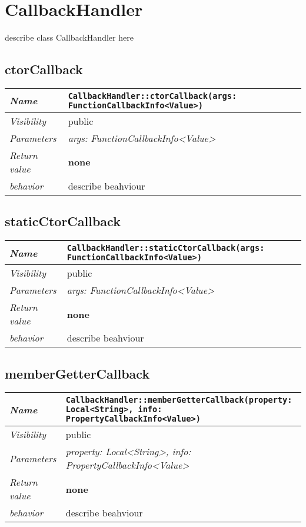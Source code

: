 \chapter{CallbackHandler}
describe class CallbackHandler here
\section{ctorCallback}
\begin{longtable}{p{3cm} @{\hskip 1cm} p{12cm}}
 \hline
\textit{Name} & \texttt{CallbackHandler::ctorCallback(args: FunctionCallbackInfo<Value>)}\\
\hline
 \textit{Visibility} & public\\
\hline
\textit{Parameters} & \textit{args: FunctionCallbackInfo<Value>}\\
\hline
\textit{Return value} & \textbf{none}\\
  \hline
 \textit{behavior} & describe beahviour \\
\hline
\end{longtable} \pagebreak
 \section{staticCtorCallback}
\begin{longtable}{p{3cm} @{\hskip 1cm} p{12cm}}
 \hline
\textit{Name} & \texttt{CallbackHandler::staticCtorCallback(args: FunctionCallbackInfo<Value>)}\\
\hline
 \textit{Visibility} & public\\
\hline
\textit{Parameters} & \textit{args: FunctionCallbackInfo<Value>}\\
\hline
\textit{Return value} & \textbf{none}\\
  \hline
 \textit{behavior} & describe beahviour \\
\hline
\end{longtable} \pagebreak
 \section{memberGetterCallback}
\begin{longtable}{p{3cm} @{\hskip 1cm} p{12cm}}
 \hline
\textit{Name} & \texttt{CallbackHandler::memberGetterCallback(property: Local<String>, info: PropertyCallbackInfo<Value>)}\\
\hline
 \textit{Visibility} & public\\
\hline
\textit{Parameters} & \textit{property: Local<String>, info: PropertyCallbackInfo<Value>}\\
\hline
\textit{Return value} & \textbf{none}\\
  \hline
 \textit{behavior} & describe beahviour \\
\hline
\end{longtable} \pagebreak
